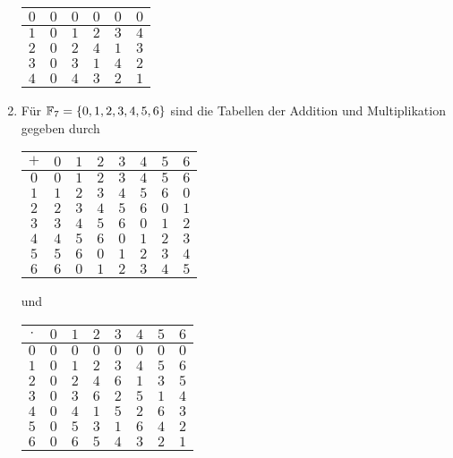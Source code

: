 \begin{bsp}
\begin{enumerate}[leftmargin=*]
\begin{center}
\begin{tabular}{|c|c|c|c|c|c|}
     $0$     & $0$ & $0$ & $0$ & $0$ & $0$ \\\hline
     $1$     & $0$ & $1$ & $2$ & $3$ & $4$ \\\hline
     $2$     & $0$ & $2$ & $4$ & $1$ & $3$ \\\hline
     $3$     & $0$ & $3$ & $1$ & $4$ & $2$ \\\hline
     $4$     & $0$ & $4$ & $3$ & $2$ & $1$ \\\hline
    \end{tabular}
   \end{center}
  \item
   Für $\mathbb{F}_7 = \{0, 1, 2, 3, 4, 5, 6\}$ sind die Tabellen der Addition und Multiplikation gegeben durch
   \begin{center}
    \begin{tabular}{|c|c|c|c|c|c|c|c|}
     \hline
     $+$ & $0$ & $1$ & $2$ & $3$ & $4$ & $5$ & $6$ \\\hline
     $0$ & $0$ & $1$ & $2$ & $3$ & $4$ & $5$ & $6$ \\\hline
     $1$ & $1$ & $2$ & $3$ & $4$ & $5$ & $6$ & $0$ \\\hline
     $2$ & $2$ & $3$ & $4$ & $5$ & $6$ & $0$ & $1$ \\\hline
     $3$ & $3$ & $4$ & $5$ & $6$ & $0$ & $1$ & $2$ \\\hline
     $4$ & $4$ & $5$ & $6$ & $0$ & $1$ & $2$ & $3$ \\\hline
     $5$ & $5$ & $6$ & $0$ & $1$ & $2$ & $3$ & $4$ \\\hline
     $6$ & $6$ & $0$ & $1$ & $2$ & $3$ & $4$ & $5$ \\\hline
    \end{tabular}
    \quad und \quad
    \begin{tabular}{|c|c|c|c|c|c|c|c|}
     \hline
     $\cdot$ & $0$ & $1$ & $2$ & $3$ & $4$ & $5$ & $6$ \\\hline
     $0$     & $0$ & $0$ & $0$ & $0$ & $0$ & $0$ & $0$ \\\hline
     $1$     & $0$ & $1$ & $2$ & $3$ & $4$ & $5$ & $6$ \\\hline
     $2$     & $0$ & $2$ & $4$ & $6$ & $1$ & $3$ & $5$ \\\hline
     $3$     & $0$ & $3$ & $6$ & $2$ & $5$ & $1$ & $4$ \\\hline
     $4$     & $0$ & $4$ & $1$ & $5$ & $2$ & $6$ & $3$ \\\hline
     $5$     & $0$ & $5$ & $3$ & $1$ & $6$ & $4$ & $2$ \\\hline
     $6$     & $0$ & $6$ & $5$ & $4$ & $3$ & $2$ & $1$ \\\hline

\end{tabular}
\end{center}
\end{enumerate}
\end{bsp}
